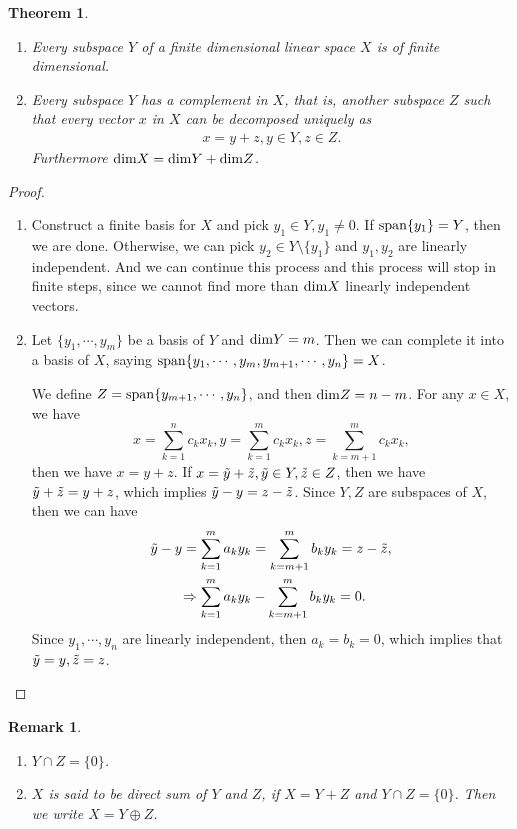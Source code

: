 \documentclass[10pt]{book}
\newtheorem{theorem}{Theorem}[chapter]
\newtheorem{remark}{Remark}[chapter]
\theoremstyle{definition}
\numberwithin{equation}{chapter}
\begin{document}
\medskip

\begin{theorem}
~\begin{enumerate}[label=(\alph*)]
    \item Every subspace $Y$ of a finite dimensional linear space $X$ is of finite dimensional.
    \item Every subspace $Y$ has a complement in $X$, that is, another subspace $Z$ such that every vector $x$ in $X$ can be decomposed uniquely as
    \begin{align*}
        x = y + z, y\in Y, z\in Z.
    \end{align*}
    Furthermore ${\rm dim}X = {\rm dim}Y + {\rm dim}Z$.
\end{enumerate}
\end{theorem}
\begin{proof}
~\begin{enumerate}[label=(\alph*)]
    \item Construct a finite basis for $X$ and pick $y_1\in Y, y_1\neq 0$. If ${\rm span}\{y_1\} = Y$, then we are done. Otherwise, we can pick $y_2\in Y\setminus\{y_1\}$ and $y_1, y_2$ are linearly independent. And we can continue this process and this process will stop in finite steps, since we cannot find more than ${\rm dim}X$ linearly independent vectors. 
    \item Let $\{y_1, \cdots, y_m\}$ be a basis of $Y$ and ${\rm dim}Y = m$. Then we can complete it into a basis of $X$, saying ${\rm span}\{y_1, \cdots, y_m, y_{m+1},\cdots, y_n\} = X$. 
    
    We define $Z = {\rm span}\{y_{m+1},\cdots, y_n\}$, and then ${\rm dim}Z = n - m$. For any $x\in X$, we have 
    $$x = \sum^n_{k=1}c_k x_k, y = \sum^m_{k=1}c_k x_k, z = \sum^m_{k=m+1}c_k x_k,$$ 
    then we have $x = y+z$. If $x = \Tilde{y} + \Tilde{z}, \Tilde{y}\in Y, \Tilde{z}\in Z$, then we have $\Tilde{y} + \Tilde{z} = y + z$, which implies $\Tilde{y} - y = z - \Tilde{z}$. Since $Y,Z$ are subspaces of $X$, then we can have 
    \begin{align*}
        \Tilde{y} - y = \sum^m_{k=1}a_ky_k & = \sum^m_{k=m+1}b_ky_k = z - \Tilde{z}, \\
        \Rightarrow \sum^m_{k=1}a_ky_k & - \sum^m_{k=m+1}b_ky_k = 0.
    \end{align*}
    Since $y_1,\cdots, y_n$ are linearly independent, then $a_k = b_k = 0$, which implies that $\Tilde{y}=y, \Tilde{z}=z$.
\end{enumerate}
\end{proof}
\begin{remark}
~\begin{enumerate}[label=(\arabic*)]
    \item $Y\cap Z = \{0\}$.
    \item $X$ is said to be direct sum of $Y$ and $Z$, if $X = Y+Z$ and $Y\cap Z = \{0\}$. Then we write $X = Y \oplus Z$.
\end{enumerate}
\end{remark}
\end{document}
